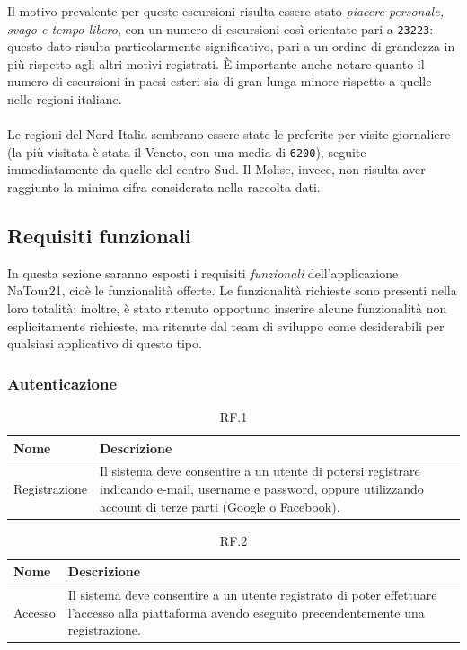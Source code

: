 \documentclass{natourDoc}
\begin{document}
Il motivo prevalente per queste escursioni risulta essere stato \textit{piacere personale, svago e tempo libero}, con un numero
di escursioni così orientate pari a \texttt{23223}: questo dato risulta particolarmente significativo, pari a un ordine
di grandezza in più rispetto agli altri motivi registrati. È importante anche notare quanto il numero di escursioni in paesi
esteri sia di gran lunga minore rispetto a quelle nelle regioni italiane.\\\\
Le regioni del Nord Italia sembrano essere state le preferite per visite giornaliere (la più visitata è stata il Veneto, con una media di
\texttt{6200}), seguite immediatamente da quelle del centro-Sud. Il Molise, invece, non risulta aver raggiunto
la minima cifra considerata nella raccolta dati.\\

\subsection{Requisiti funzionali}
In questa sezione saranno esposti i requisiti \textit{funzionali} dell'applicazione NaTour21, cioè le funzionalità offerte.
Le funzionalità richieste sono presenti nella loro totalità; inoltre, è stato ritenuto opportuno inserire alcune funzionalità non 
esplicitamente richieste, ma ritenute dal team di sviluppo come desiderabili per qualsiasi applicativo di questo tipo.

\subsubsection{Autenticazione}
\begin{table}[H]
	\centering
	\begin{tabular}{ |p{5cm}|p{10.3cm}| }
		\hline
		\rowcolor{PineGreen!70}
		\textbf{Nome} & \textbf{Descrizione}                                                                                                                                      \\
		\hline
		Registrazione & Il sistema deve consentire a un utente di potersi registrare indicando e-mail, username e password, oppure utilizzando account di terze parti (Google o Facebook). \\
		\hline
	\end{tabular}
	\caption{RF.1}
\end{table}

\begin{table}[H]
	\centering
	\begin{tabular}{ |p{5cm}|p{10.3cm}| }
		\hline
		\rowcolor{PineGreen!70}
		\textbf{Nome} & \textbf{Descrizione}                                                                                                                       \\
		\hline
		Accesso       & Il sistema deve consentire a un utente registrato di poter effettuare l'accesso alla piattaforma avendo eseguito precendentemente una registrazione. \\
		\hline
	\end{tabular}
	\caption{RF.2}

\end{table}
\end{document}
